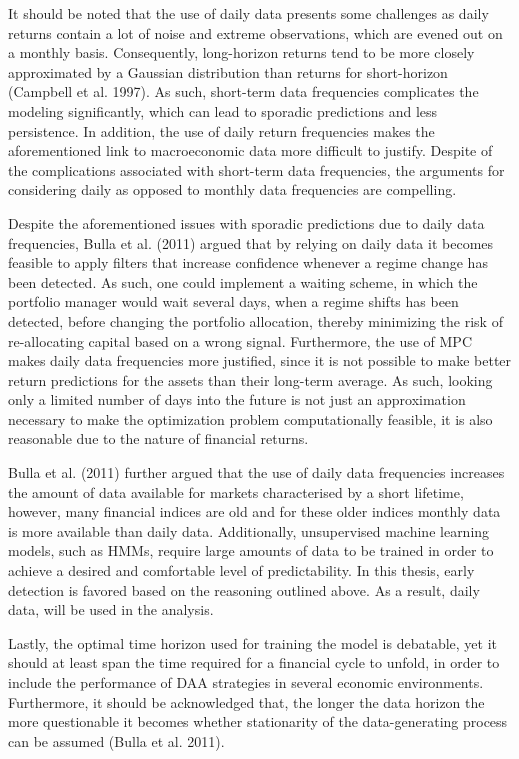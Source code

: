 It should be noted that the use of daily data presents some challenges as daily returns contain a lot of noise and extreme observations, which are evened out on a monthly basis. Consequently, long-horizon returns tend to be more closely approximated by a Gaussian distribution than returns for short-horizon (Campbell et al. 1997). As such, short-term data frequencies complicates the modeling significantly, which can lead to sporadic predictions and less persistence. In addition, the use of daily return frequencies makes the aforementioned link to macroeconomic data more difficult to justify. Despite of the complications associated with short-term data frequencies, the arguments for considering daily as opposed to monthly data frequencies are compelling. 

Despite the aforementioned issues with sporadic predictions due to daily data frequencies, Bulla et al. (2011) argued that by relying on daily data it becomes feasible to apply filters that increase confidence whenever a regime change has been detected. As such, one could implement a waiting scheme, in which the portfolio manager would wait several days, when a regime shifts has been detected, before changing the portfolio allocation, thereby minimizing the risk of re-allocating capital based on a wrong signal. Furthermore, the use of MPC makes daily data frequencies more justified, since it is not possible to make better return predictions for the assets than their long-term average. As such, looking only a limited number of days into the future is not just an approximation necessary to make the optimization problem computationally feasible, it is also reasonable due to the nature of financial returns.

Bulla et al. (2011) further argued that the use of daily data frequencies increases the amount of data available for markets characterised by a short lifetime, however, many financial indices are old and for these older indices monthly data is more available than daily data. Additionally, unsupervised machine learning models, such as HMMs, require large amounts of data to be trained in order to achieve a desired and comfortable level of predictability. In this thesis, early detection is favored based on the reasoning outlined above. As a result, daily data, will be used in the analysis.  

Lastly, the optimal time horizon used for training the model is debatable, yet it should at least span the time required for a financial cycle to unfold, in order to include the performance of DAA strategies in several economic environments. Furthermore, it should be acknowledged that, the longer the data horizon the more questionable it becomes whether stationarity of the data-generating process can be assumed (Bulla et al. 2011).

